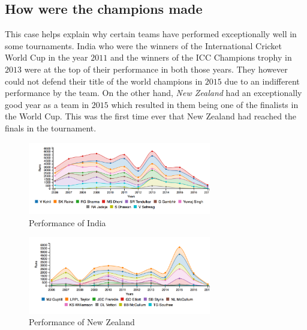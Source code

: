 \documentclass[letterpaper,10pt]{article}
\begin{document}
\begin{multicols}{2}
\subsection{How were the champions made}
This case helps explain why certain teams have performed exceptionally well in some tournaments. India who were the winners of the International Cricket World Cup in the year $2011$ and the winners of the ICC Champions trophy in $2013$ were at the top of their performance in both those years. They however could not defend their title of the world champions in $2015$ due to an indifferent performance by the team. On the other hand, \textit{New Zealand} had an exceptionally good year as a team in $2015$ which resulted in them being one of the finalists in the World Cup. This was the first time ever that New Zealand had reached the finals in the tournament.

\begin{figure}[H]
\begin{center}
{\includegraphics[width = 8cm]{india_case3.png}
\caption{Performance of India}
}
\end{center}
\end{figure}

\begin{figure}[H]
\begin{center}
{\includegraphics[width = 8cm]{newzealand_case3.png}
\caption{Performance of New Zealand}
}
\end{center}
\end{figure}


\end{multicols}
\end{document}
